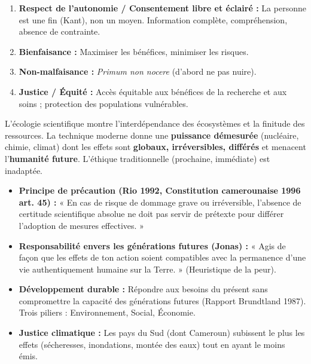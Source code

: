 \documentclass[11pt]{article}
\begin{document}
\begin{propriete}
\begin{enumerate}
\item \textbf{Respect de l'autonomie / Consentement libre et éclairé :} La personne est une fin (Kant), non un moyen. Information complète, compréhension, absence de contrainte.
\item \textbf{Bienfaisance :} Maximiser les bénéfices, minimiser les risques.
\item \textbf{Non-malfaisance :} \emph{Primum non nocere} (d'abord ne pas nuire).
\item \textbf{Justice / Équité :} Accès équitable aux bénéfices de la recherche et aux soins ; protection des populations vulnérables.
\end{enumerate}
\end{propriete}

\begin{definition}
L'écologie scientifique montre l'interdépendance des écosystèmes et la finitude des ressources. La technique moderne donne une \textbf{puissance démesurée} (nucléaire, chimie, climat) dont les effets sont \textbf{globaux, irréversibles, différés} et menacent l'\textbf{humanité future}. L'éthique traditionnelle (prochaine, immédiate) est inadaptée.
\end{definition}

\begin{aretenir}
\begin{itemize}
\item \textbf{Principe de précaution (Rio 1992, Constitution camerounaise 1996 art. 45) :} « En cas de risque de dommage grave ou irréversible, l'absence de certitude scientifique absolue ne doit pas servir de prétexte pour différer l'adoption de mesures effectives. »
\item \textbf{Responsabilité envers les générations futures (Jonas) :} « Agis de façon que les effets de ton action soient compatibles avec la permanence d'une vie authentiquement humaine sur la Terre. » (Heuristique de la peur).
\item \textbf{Développement durable :} Répondre aux besoins du présent sans compromettre la capacité des générations futures (Rapport Brundtland 1987). Trois piliers : Environnement, Social, Économie.
\item \textbf{Justice climatique :} Les pays du Sud (dont Cameroun) subissent le plus les effets (sécheresses, inondations, montée des eaux) tout en ayant le moins émis.
\end{itemize}
\end{aretenir}
\end{document}
